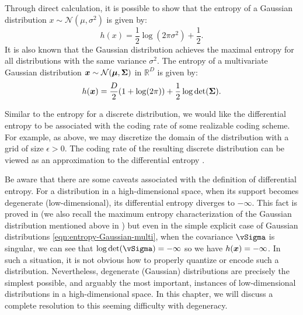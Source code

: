 \documentclass[../../book-main.tex]{subfiles}
\begin{document}
\begin{example}
	Through direct calculation, it is possible to show that the entropy of a Gaussian distribution $x \sim \mathcal{N}(\mu, \sigma^2)$ is given by:
	\begin{equation}
		h(x) = \frac{1}{2}\log (2\pi \sigma^2) + \frac{1}{2}.
		\label{eqn:entropy-Gaussian}
	\end{equation}
	It is also known that the Gaussian distribution achieves the maximal entropy
	for all distributions with the same variance $\sigma^2$. The entropy of a multivariate Gaussian distribution $\bm{x} \sim \mathcal{N}(\boldsymbol{\mu}, \boldsymbol{\Sigma})$ in $\mathbb{R}^D$ is given by:
	\begin{equation}
		h(\bm{x}) = \frac{D}{2}(1 + \log(2\pi)) + \frac{1}{2}\log\det(\boldsymbol{\Sigma}).
		\label{eqn:entropy-Gaussian-multi}
	\end{equation}
\end{example}

Similar to the entropy for a discrete distribution, we would like the
differential entropy to be associated with the coding rate of some realizable
coding scheme. For example, as above, we may discretize the domain of the distribution with a grid of size $\epsilon >0$. The coding rate of the resulting discrete distribution can be viewed as an approximation to the differential entropy \cite{Cover-Thomas}.


Be aware that there are some caveats associated with the definition of
differential entropy. For a distribution in a high-dimensional space, when its
support becomes degenerate (low-dimensional), its differential entropy diverges
to \(-\infty\). This fact is proved in
 (we also recall the
maximum entropy characterization of the Gaussian distribution mentioned above in
) but even in the simple explicit case of Gaussian
distributions \eqref{eqn:entropy-Gaussian-multi}, when the covariance
\(\vSigma\) is singular, we can see that \(\log\det(\vSigma) = -\infty\) so we have $h(\bm{x}) = -\infty$. In such a situation, it is not obvious how to properly quantize or encode such a distribution. Nevertheless, degenerate (Gaussian) distributions are precisely the simplest possible, and arguably the most important, instances of low-dimensional distributions in a high-dimensional space. In this chapter, we will discuss a complete resolution to this seeming difficulty with degeneracy.
\end{document}
